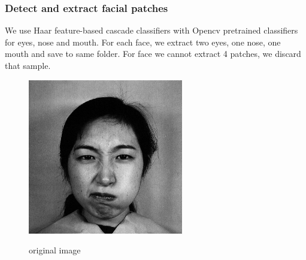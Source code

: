 \documentclass[a4paper, 12pt]{article}
\begin{document}
\subsubsection{Detect and extract facial patches}
\label{sec:preprocessing_facial_patches}
We use Haar feature-based cascade classifiers \cite{viola2001rapid} with Opencv  \cite{bradski2000opencv} pretrained classifiers for eyes, nose and mouth. For each face, we extract two eyes, one nose, one mouth and save to same folder. For face we cannot extract 4 patches, we discard that sample.
\begin{figure}[H]
	\centering
	\includegraphics[width=1\linewidth]{./raw/KAAN139.png}
	\caption[]{original image}
	\label{fig:lbp_to_output}
	\cite{lbptutorial}
\end{figure}
\end{document}
